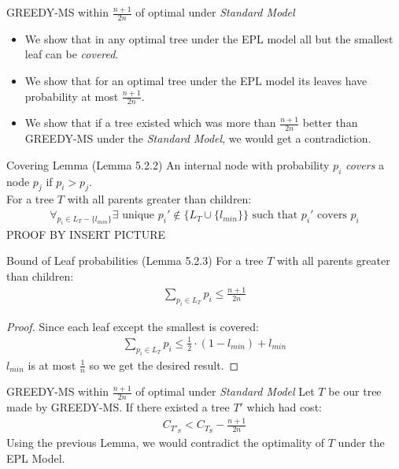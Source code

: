 \documentclass{beamer}
\theoremstyle{plain}
\begin{document}
\begin{frame}{GREEDY-MS within $\frac{n+1}{2n}$ of optimal under \textit{Standard Model} }
\begin{itemize}
\item[1.] We show that in any optimal tree under the EPL model all but the smallest leaf can be \textit{covered}.
\item[2.] We show that for an optimal tree under the EPL model its leaves have probability at most $\frac{n+1}{2n}$.
\item[3.] We show that if a tree existed which was more than  $\frac{n+1}{2n}$ better than GREEDY-MS under the \textit{Standard Model}, we would get a contradiction.
\end{itemize}
\end{frame}

\begin{frame}{Covering Lemma (Lemma 5.2.2)}
An internal node with probability $p_i$ \textit{covers} a node $p_j$ if $p_i > p_j$.\\
For a tree $T$ with all parents greater than children:
\begin{align*}
\forall_{p_i \in L_T-\{l_{min}\}} \exists \text{ unique } p_i' \notin \{L_T \cup \{l_{min}\}\} \text{ such that } p_i' \text{ covers } p_i
\end{align*}
PROOF BY INSERT PICTURE

\end{frame}

\begin{frame}{Bound of Leaf probabilities (Lemma 5.2.3)}
For a tree $T$ with all parents greater than children:
\begin{align*}
\sum_{p_i \in L_T} p_i \leq \frac{n+1}{2n}
\end{align*}
\begin{proof}
Since each leaf except the smallest is covered:
\begin{align*}
\sum_{p_i \in L_T} p_i \leq \frac{1}{2} \cdot (1-l_{min}) + l_{min}
\end{align*}
$l_{min}$ is at most $\frac{1}{n}$ so we get the desired result.
\end{proof}
\end{frame}

\begin{frame}{GREEDY-MS within $\frac{n+1}{2n}$ of optimal under \textit{Standard Model}}
Let $T$ be our tree made by GREEDY-MS. If there existed a tree $T'$ which had cost:
\begin{align*}
C_{T'_S} < C_{T_S} - \frac{n+1}{2n}
\end{align*}
Using the previous Lemma, we would contradict the optimality of $T$ under the EPL Model.
\end{frame}
\end{document}
